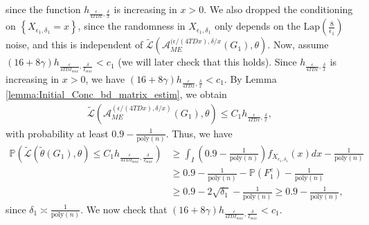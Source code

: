 \documentclass{article}
\begin{document}
since the function $h_{\frac{\epsilon}{4TDx}, \frac{\delta}{x}}$ is increasing in $x > 0$. We also dropped the conditioning on $\left\{X_{\epsilon_1, \delta_1} = x\right\}$, since the randomness in $X_{\epsilon_1, \delta_1}$ only depends on the $\mathrm{Lap}\left(\frac{8}{\epsilon_1}\right)$ noise, and this is independent of $\widetilde{\mathcal{L}}\left(\mathcal{A}_{ME}^{(\epsilon/(4TDx), \delta/x}(G_1), \theta\right)$. Now, assume $(16 + 8\gamma)h_{\frac{\epsilon}{4TDI_{max}}, \frac{\delta}{I_{max}}} < c_1$ (we will later check that this holds). Since $h_{\frac{\epsilon}{4TDx}, \frac{\delta}{x}}$ is increasing in $x > 0$, we have $(16 + 8\gamma)h_{\frac{\epsilon}{4TDx}, \frac{\delta}{x}} < c_1$. By Lemma \ref{lemma:Initial_Conc_bd_matrix_estim}, we obtain
\begin{align*}
\widetilde{\mathcal{L}}\left(\mathcal{A}_{ME}^{\left(\epsilon/(4TDx), \delta/x\right)}(G_1), \theta\right) \leq C_1h_{\frac{\epsilon}{4TDx}, \frac{\delta}{x}},
\end{align*}
with probability at least $0.9 -\frac{1}{\mathrm{poly}(n)}$. Thus, we have
\begin{align*}
\mathbb{P}\left(\widetilde{\mathcal{L}}\left(\widetilde{\theta}(G_1), \theta\right) \leq C_1h_{\frac{\epsilon}{4TDI_{max}}, \frac{\delta}{I_{max}}}\right) &\geq \int_I\left(0.9 - \frac{1}{\mathrm{poly}(n)}\right)f_{X_{\epsilon_1, \delta_1}}(x)dx - \frac{1}{\mathrm{poly}(n)}\\
&\geq 0.9 - \frac{1}{\mathrm{poly}(n)} - \mathbb{P}(F_1^c) - \frac{1}{\mathrm{poly}(n)}\\
&\geq 0.9 - 2\sqrt{\delta_1} - \frac{1}{\mathrm{poly}(n)} \geq 0.9 - \frac{1}{\mathrm{poly}(n)},
\end{align*}
since $\delta_1 \asymp \frac{1}{\mathrm{poly}(n)}$.
We now check that $(16 + 8\gamma)h_{\frac{\epsilon}{4TDI_{max}}, \frac{\delta}{I_{max}}} < c_1$. 
\end{document}
